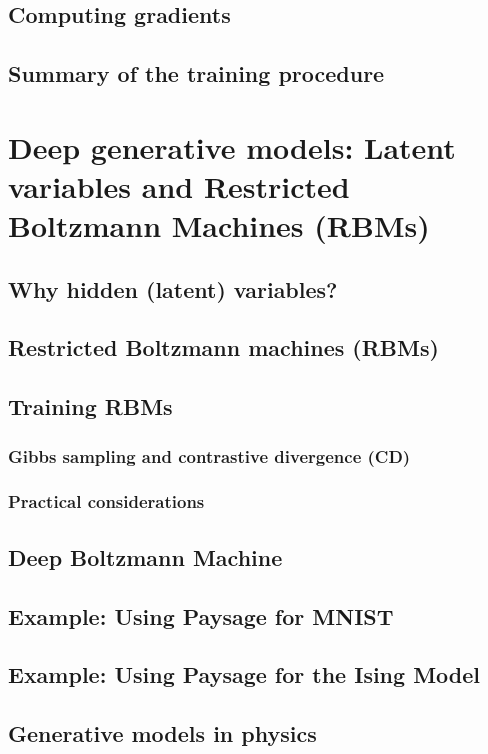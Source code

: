 \documentclass[norsk,a4paper,11pt]{article}
\begin{document}
\subsection{Computing gradients}
\subsection{Summary of the training procedure}




\section{Deep generative models: Latent variables and Restricted Boltzmann Machines (RBMs)}
\subsection{Why hidden (latent) variables?}
\subsection{Restricted Boltzmann machines (RBMs)}
\subsection{Training RBMs}
\subsubsection{Gibbs sampling and contrastive divergence (CD)}
\subsubsection{Practical considerations}

\subsection{Deep Boltzmann Machine}
\subsection{Example: Using Paysage for MNIST}
\subsection{Example: Using Paysage for the Ising Model}
\subsection{Generative models in physics}
\end{document}
